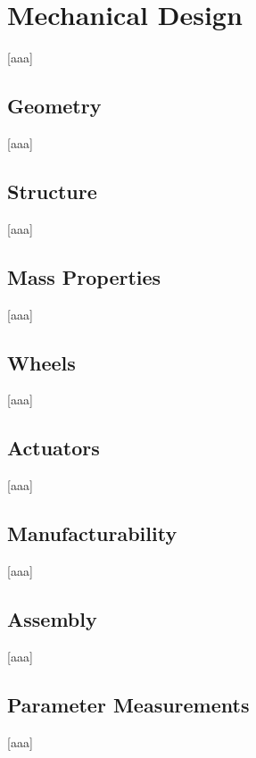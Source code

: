 \chapter{Mechanical Design} \label{sec:Mechanical Design}
    [aaa]

\section{Geometry} \label{sec:Geometry}
    [aaa]

\section{Structure} \label{sec:Structure}
    [aaa]

\section{Mass Properties} \label{sec:Mass Properties}
    [aaa]

\section{Wheels} \label{sec:Wheels}
    [aaa]

\section{Actuators} \label{sec:Actuators}
    [aaa]

\section{Manufacturability} \label{sec:Manufacturability}
    [aaa]

\section{Assembly} \label{sec:Assembly}
    [aaa]

\section{Parameter Measurements} \label{sec:Parameter Measurements}
    [aaa]